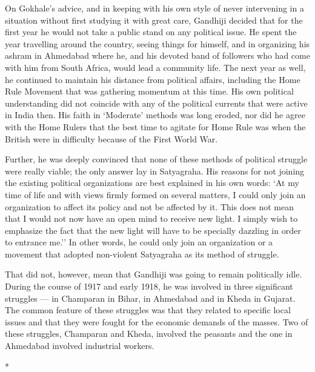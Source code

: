 On Gokhale's advice, and in keeping with his own style of never intervening in a situation without first studying it with great care, Gandhiji decided that for the first year he would not take a public stand on any political issue. He spent the year travelling around the country, seeing things for himself, and in organizing his ashram in Ahmedabad where he, and his devoted band of followers who had come with him from South Africa, would lead a community life. The next year as well, he continued to maintain his distance from political affairs, including the Home Rule Movement that was gathering momentum at this time. His own political understanding did not coincide with any of the political currents that were active in India then. His faith in `Moderate' methods was long eroded, nor did he agree with the Home Rulers that the best time to agitate for Home Rule was when the British were in difficulty because of the First World War.

Further, he was deeply convinced that none of these methods of political struggle were really viable; the only answer lay in Satyagraha. His reasons for not joining the existing political organizations are best explained in his own words: `At my time of life and with views firmly formed on several matters, I could only join an organization to affect its policy and not be affected by it. This does not mean that I would not now have an open mind to receive new light. I simply wish to emphasize the fact that the new light will have to be specially dazzling in order to entrance me.'' In other words, he could only join an organization or a movement that adopted non-violent Satyagraha as its method of struggle.

That did not, however, mean that Gandhiji was going to remain politically idle. During the course of 1917 and early 1918, he was involved in three significant struggles — in Champaran in Bihar, in Ahmedabad and in Kheda in Gujarat. The common feature of these struggles was that they related to specific local issues and that they were fought for the economic demands of the masses. Two of these struggles, Champaran and Kheda, involved the peasants and the one in Ahmedabad involved industrial workers.

\begin{center}*\end{center}

\paragraph*{}


